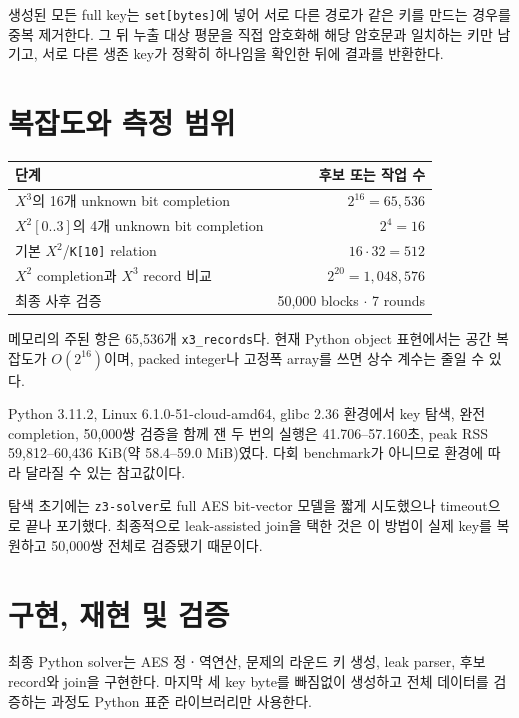 \documentclass[10pt,a4paper]{article}
\begin{document}
생성된 모든 full key는 \texttt{set[bytes]}에 넣어 서로 다른 경로가
같은 키를 만드는 경우를 중복 제거한다. 그 뒤 누출 대상 평문을 직접
암호화해 해당 암호문과 일치하는 키만 남기고, 서로 다른 생존 key가
정확히 하나임을 확인한 뒤에 결과를 반환한다.

\section{복잡도와 측정 범위}

\begin{center}
\begin{tabularx}{\textwidth}{Xr}
\toprule
단계 & 후보 또는 작업 수 \\
\midrule
$X^3$의 16개 unknown bit completion & $2^{16}=65{,}536$ \\
$X^2[0..3]$의 4개 unknown bit completion & $2^4=16$ \\
기본 $X^2$/\texttt{K[10]} relation & $16\mathbin{\cdot}32=512$ \\
$X^2$ completion과 $X^3$ record 비교 & $2^{20}=1{,}048{,}576$ \\
최종 사후 검증 & 50,000 blocks $\mathbin{\cdot}$ 7 rounds \\
\bottomrule
\end{tabularx}
\end{center}

메모리의 주된 항은 65,536개 \texttt{x3\_records}다. 현재 Python
object 표현에서는 공간 복잡도가 $O(2^{16})$이며, packed integer나
고정폭 array를 쓰면 상수 계수는 줄일 수 있다.

Python 3.11.2, Linux 6.1.0-51-cloud-amd64, glibc 2.36 환경에서 key
탐색, 완전 completion, 50,000쌍 검증을 함께 잰 두 번의 실행은
41.706--57.160초, peak RSS 59,812--60,436 KiB(약 58.4--59.0 MiB)였다.
다회 benchmark가 아니므로 환경에 따라 달라질 수 있는 참고값이다.

탐색 초기에는 \texttt{z3-solver}로 full AES bit-vector 모델을 짧게
시도했으나 timeout으로 끝나 포기했다. 최종적으로 leak-assisted join을
택한 것은 이 방법이 실제 key를 복원하고 50,000쌍 전체로 검증됐기
때문이다.

\section{구현, 재현 및 검증}

최종 Python solver는 AES 정ㆍ역연산, 문제의 라운드 키 생성, leak
parser, 후보 record와 join을 구현한다. 마지막 세 key byte를 빠짐없이
생성하고 전체 데이터를 검증하는 과정도 Python 표준 라이브러리만
사용한다.
\end{document}
